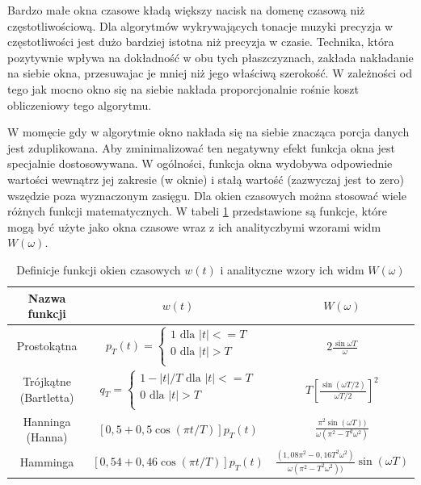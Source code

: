 \documentclass[12pt,a4paper,twoside]{mwart}
\begin{document}
Bardzo małe okna czasowe kładą większy nacisk na domenę czasową niż częstotliwościową. Dla algorytmów wykrywających tonacje muzyki precyzja w częstotliwości jest dużo bardziej istotna niż precyzja w czasie. Technika, która pozytywnie wpływa na dokładność w obu tych płaszczyznach, zakłada nakładanie na siebie okna, przesuwajac je mniej niż jego właściwą szerokość. W zależności od tego jak mocno okno się na siebie nakłada proporcjonalnie rośnie koszt obliczeniowy tego algorytmu. \cite{WindowChoiceStrategiesSTFT}

W momęcie gdy w algorytmie okno nakłada się na siebie znacząca porcja danych jest zduplikowana. Aby zminimalizować ten negatywny efekt funkcja okna jest specjalnie dostosowywana. W ogólności, funkcja okna wydobywa odpowiednie wartości wewnątrz jej zakresie (w oknie) i stałą wartość (zazwyczaj jest to zero) wszędzie poza wyznaczonym zasięgu. Dla okien czasowych można stosować wiele różnych funkcji matematycznych. W tabeli \ref{tab:definicjeOkien} przedstawione są funkcje, które mogą być użyte jako okna czasowe wraz z ich analityczbymi wzorami widm $W(\omega)$\cite[103, 106]{CyfrowePrzetwarzanieSygnalowOdTeoriiDoZastosowan}\cite{RobustMethodOfMeasurmentOfFundamentalFq}.
\begin{table}[H]
  \begin{center}
    \begin{tabular}{ |c|c|c| } 
    \hline
    Nazwa funkcji & $w(t)$ & $W(\omega)$\\
    \hline
    Prostokątna & $p_T (t) = \left\{
      \begin{array}{ll}
        1 \text{ dla } |t| <= T\\
        0 \text{ dla } |t| > T\\
      \end{array}
    \right.  $ & $2\frac{\sin \omega T}{\omega}$\\
    \hline
    Trójkątne (Bartletta) & $q_T = \left\{
      \begin{array}{ll}
        1-|t|/T \text{ dla } |t| <= T\\
        0 \text{ dla } |t| > T\\
      \end{array}
    \right. $ & $T[\frac{\sin(\omega T / 2)}{\omega T/2}]^2$\\
    \hline
    Hanninga (Hanna) & $[0,5 + 0,5 \cos(\pi t / T)]p_T (t)$ & 
    $\frac{\pi^2 \sin(\omega T))}{\omega(\pi^2 - T^2 \omega^2)}$\\
    \hline
    Hamminga & $[0,54 + 0,46\cos(\pi t/T)]p_T (t)$ & 
    $\frac{(1,08\pi^2 - 0,16T^2\omega^2)}{\omega(\pi^2 - T^2 \omega^2))}\sin(\omega T)$\\
    \hline
    \end{tabular}
  \end{center}
  \caption{Definicje funkcji okien czasowych $w(t)$ i analityczne wzory ich widm $W(\omega)$}
  \label{tab:definicjeOkien}
\end{table}
\end{document}
